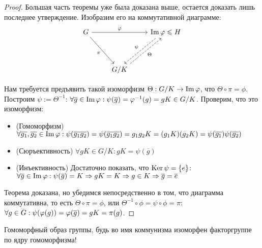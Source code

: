 \begin{proof}
	Большая часть теоремы уже была доказана выше, остается доказать лишь последнее утверждение. Изобразим его на коммутативной диаграмме:
	\[
		\begin{tikzcd}[row sep = huge]
			G \arrow{rr}{\phi} \arrow[swap]{dr}{\pi} && \im\phi \le H \arrow[dashrightarrow, swap, xshift = -4pt]{dl}{\psi}\\
			& G / K \arrow[dashrightarrow, swap, xshift = 4pt]{ur}{\Theta} &
		\end{tikzcd}
	\]
	
	Нам требуется предъявить такой изоморфизм $\Theta: G / K \to \operatorname{Im}\varphi$, что $\Theta \circ \pi = \phi$. Построим $\psi := \Theta^{-1}$: $\forall \overline{g} \in \im\phi: \psi(\overline{g}) = \phi^{-1}(g) \hm= gK \in G / K$. Проверим, что это изоморфизм:
	\begin{itemize}
		\item (Гомоморфизм) $\forall \overline{g_1}, \overline{g_2} \in \im\phi: \psi(\overline{g_1}\overline{g_2}) = \psi(\overline{g_1g_2}) = g_1g_2K \hm= (g_1K)(g_2K) = \psi(\overline{g_1})\psi(\overline{g_2})$
		\item (Сюръективность) $\forall gK \in G / K: gK = \psi(\overline{g})$
		\item (Инъективность) Достаточно показать, что $\operatorname{Ker}\psi = \{e\}$: $\forall \overline{g} \hm\in \im\phi: \psi(\overline{g}) = K \hm\Rightarrow gK = K \Rightarrow g \in K \Rightarrow \overline{g} = \overline{e}$
	\end{itemize}

	Теорема доказана, но убедимся непосредственно в том, что диаграмма коммутативна, то есть $\Theta \circ \pi = \phi$, или $\Theta^{-1} \circ \phi = \psi \circ \phi = \pi$: $\forall g \hm\in G: \psi(\phi(g)) = \phi(\overline{g}) = gK = \pi(g)$.
\end{proof}

\begin{note}
	Гомоморфный образ группы, будь во имя коммунизма изоморфен факторгруппе по ядру гомоморфизма!
\end{note}